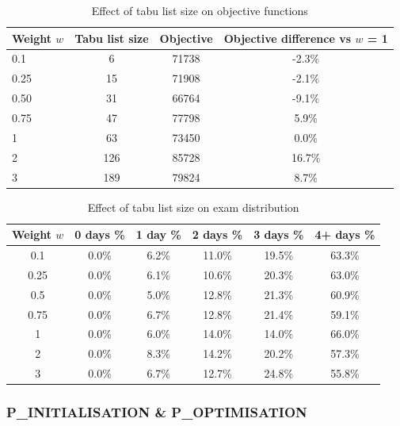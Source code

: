 \begin{table}[h]
	\caption{Effect of tabu list size on objective functions}
	\label{tab:tuning_tabu_obj}
	\centering
	\begin{tabular}{l c c c }
		\hline
  	\textbf{Weight $w$}	                & 
     	\textbf{Tabu list size}	                & 
    \textbf{Objective} & 
    \textbf{Objective difference vs $w$ = 1} \\ \hline
        0.1 & 6 & 71738 & -2.3\%  \\ 
        0.25& 15 & 71908 & -2.1\%  \\ 
        0.50 & 31 & 66764 & -9.1\%  \\ 
        0.75 & 47 & 77798 & 5.9\% \\
        1 & 63 &73450 & 0.0\% \\
        2 & 126 & 85728 & 16.7\% \\
        3 & 189 & 79824 & 8.7\% \\
        \hline
	\end{tabular}
\end{table}

\begin{table}[h]
	\caption{Effect of tabu list size on exam distribution}
	\label{tab:tuning_tabu_distr}
	\centering
	\begin{tabular}{c c c c c c}
		\hline
  	\textbf{Weight $w$}	&
   \textbf{0 days \% } &
    \textbf{1 day \% } & 
    \textbf{2 days \% } &
    \textbf{3 days \% } & 
    \textbf{4+ days \%}\\ \hline
    0.1 & 0.0\% & 6.2\% & 11.0\% & 19.5\% & 63.3\% \\
    0.25 & 0.0\% & 6.1\% & 10.6\% & 20.3\% & 63.0\% \\
    0.5 & 0.0\% & 5.0\% & 12.8\% & 21.3\% & 60.9\% \\
    0.75 & 0.0\% & 6.7\% & 12.8\% & 21.4\% & 59.1\% \\
    1 & 0.0\% & 6.0\% & 14.0\% & 14.0\% & 66.0\% \\
    2 & 0.0\% & 8.3\% & 14.2\% & 20.2\% & 57.3\% \\
    3 & 0.0\% & 6.7\% & 12.7\% & 24.8\% & 55.8\% \\

        \hline
	\end{tabular}
\end{table}

\subsubsection{P\_INITIALISATION \& P\_OPTIMISATION}

